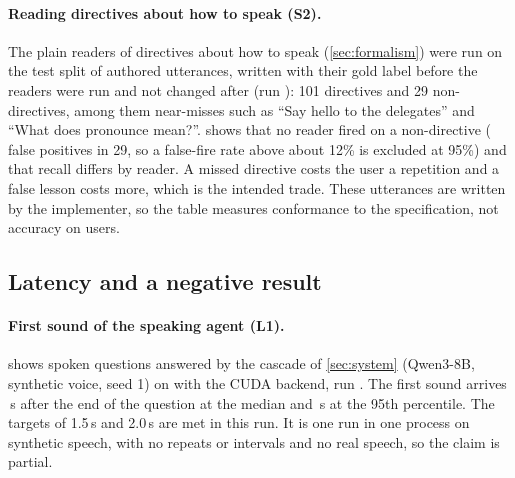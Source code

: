 \begin{table}[t]
\centering\small

\caption{One planted reward (fewer codec frames per word), three training methods, held-out sentences before and after twelve updates.}
\label{tab:methods}
\end{table}

\paragraph{Reading directives about how to speak (S2).}
The plain readers of directives about how to speak (\cref{sec:formalism}) were run on the test split of \ExtractTestSize{} authored utterances, written with their gold label before the readers were run and not changed after (run ): 101 directives and 29 non-directives, among them near-misses such as ``Say hello to the delegates'' and ``What does pronounce mean?''.
 shows that no reader fired on a non-directive (\ExtractFalsePositives{} false positives in 29, so a false-fire rate above about 12\% is excluded at 95\%) and that recall differs by reader. A missed directive costs the user a repetition and a false lesson costs more, which is the intended trade. These utterances are written by the implementer, so the table measures conformance to the specification, not accuracy on users.

\begin{table}[t]
\centering\small

\caption{Rule-based readers on the test split, each asked only about the turns it would be listening to. Precision and recall of firing on the utterances of its class.}
\label{tab:extraction}
\end{table}

\subsection{Latency and a negative result}

\paragraph{First sound of the speaking agent (L1).}
 shows \LatencyTurns{} spoken questions answered by the cascade of \cref{sec:system} (Qwen3-8B, synthetic voice, seed 1) on \LatencyGpu{} with the CUDA backend, run \code{\LatencyRunId}. The first sound arrives \FirstSoundPfifty{}\,s after the end of the question at the median and \FirstSoundPninetyfive{}\,s at the 95th percentile.
The targets of 1.5\,s and 2.0\,s are met in this run. It is one run in one process on synthetic speech, with no repeats or intervals and no real speech, so the claim is partial.

